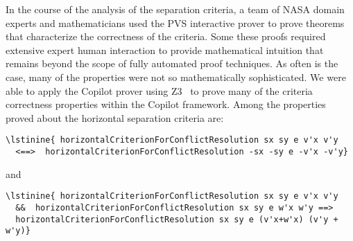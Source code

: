 In the course of the analysis of the separation criteria, a team of
NASA domain experts and mathematicians used the PVS interactive prover
to prove theorems that characterize the correctness of the
criteria. Some these proofs required extensive expert human
interaction to provide mathematical intuition that remains beyond the
scope of fully automated proof techniques. As often is the case, many
of the properties were not so mathematically sophisticated.  We were
able to apply the Copilot prover  using Z3~\cite{XXX}  to prove
many of the criteria correctness properties within the Copilot
framework. Among the properties proved about the horizontal separation
criteria are: 

\begin{lstlisting}[frame=single]
\lstinine{ horizontalCriterionForConflictResolution sx sy e v'x v'y 
  <==>  horizontalCriterionForConflictResolution -sx -sy e -v'x -v'y} 
\end{lstlisting}

and

\begin{lstlisting}[frame=single]
\lstinine{ horizontalCriterionForConflictResolution sx sy e v'x v'y
  &&  horizontalCriterionForConflictResolution sx sy e w'x w'y ==>
  horizontalCriterionForConflictResolution sx sy e (v'x+w'x) (v'y + w'y)} 
\end{lstlisting}




